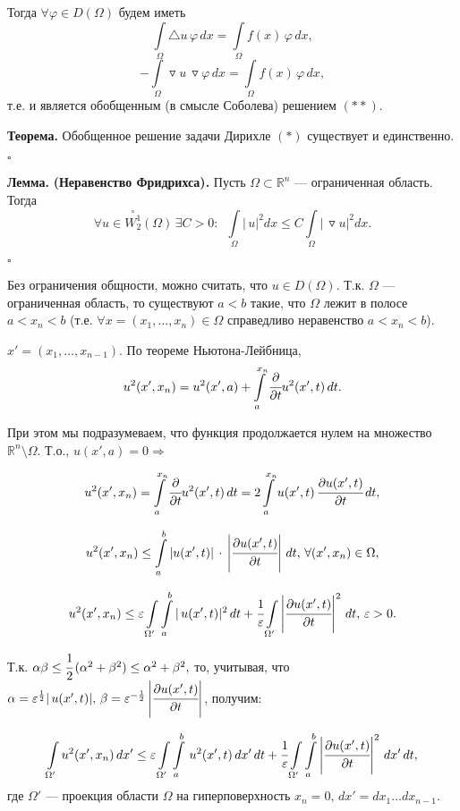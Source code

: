 \documentclass[unicode,12pt,draft]{article}
\begin{document}
Тогда $\forall \varphi \in D(\Omega)$ будем иметь
$$\int\limits_{\Omega}\triangle u\,\varphi\,dx=
\int\limits_{\Omega}f(x)\,\varphi\,dx,$$
$$-\int\limits_{\Omega}\triangledown
u\,\triangledown\varphi\,dx=
\int\limits_{\Omega}f(x)\,\varphi\,dx,$$ т.е. и является
обобщенным (в смысле Соболева) решением $(**)$.

\textbf{Теорема.} Обобщенное решение задачи Дирихле $(*)$
существует и единственно.

$\square$

\textbf{Лемма.} \textbf{(Неравенство Фридрихса).} Пусть
$\Omega\subset \mathbb R^n$ --- ограниченная область. Тогда
$$\forall u\in \overset{\circ}{W_2^1}(\Omega)\,\exists
C>0\colon\,\,\,\int\limits_{\Omega}|\,u|^2dx\le C
\int\limits_{\Omega}|\,\triangledown u|^2 dx.$$

$\square$

Без ограничения общности, можно считать, что $u\in D(\Omega)$.
Т.к. $\Omega$ --- ограниченная область, то существуют $a<b$
 такие, что $\Omega$ лежит в полосе $a<x_n<b$ (т.е. $\forall
 x=(x_1,\ldots,x_n)\in\Omega$ справедливо неравенство $a<x_n<b$).

$x'=(x_1,\ldots,x_{n-1}).$ По теореме Ньютона-Лейбница,
$$u^2(x',x_n)=u^2(x',a)+\int\limits_a^{x_n}\cfrac{\partial}{\partial t}u^2(x',t)\,dt.$$

При этом мы подразумеваем, что функция продолжается нулем на
множество $\mathbb R^n\setminus\Omega.$ Т.о.,
$u(x',a)=0\Rightarrow$

$$u^2(x',x_n)=\int\limits_a^{x_n}\cfrac{\partial}{\partial t}u^2(x',t)\,dt=
2\int\limits_a^{x_n}u(x',t)\,\cfrac{\partial u(x',t)}{\partial
t}\,dt,$$

$$u^2(x',x_n)\le \int\limits_a^{b}|u(x',t)|\,\cdot\,\left|\cfrac{\partial u(x',t)}{\partial
t}\right|\,dt,\,\forall (x',x_n)\in\Omega,$$

$$u^2(x',x_n)\le
\varepsilon
\int\limits_{\Omega'}\int\limits_a^{b}|\,u(x',t)|^2\,dt+
\cfrac1{\varepsilon} \int\limits_{\Omega'}\left|\cfrac{\partial
u(x',t)}{\partial t}\right|^2\,dt,\,\varepsilon>0.$$

Т.к. $\alpha\beta\le \cfrac12\,(\alpha^2+\beta^2)\le
\alpha^2+\beta^2,$ то, учитывая, что
$\alpha=\varepsilon^{\frac12}|\,u(x',t)|,\,
\beta=\varepsilon^{-\frac12}\left|\cfrac{\partial
u(x',t)}{\partial t}\right|$, получим:

$$\int\limits_{\Omega'}u^2(x',x_n)\,dx'\le
\varepsilon
\int\limits_{\Omega'}\int\limits_a^{b}\,u^2(x',t)\,dx'\,dt+
\cfrac1{\varepsilon}
\int\limits_{\Omega'}\int\limits_a^{b}\left|\cfrac{\partial
u(x',t)}{\partial t}\right|^2\,dx'\,dt,$$ где $\Omega'$ ---
проекция области $\Omega$ на гиперповерхность
$x_n=0,\,dx'=dx_1\ldots dx_{n-1}.$
\end{document}

